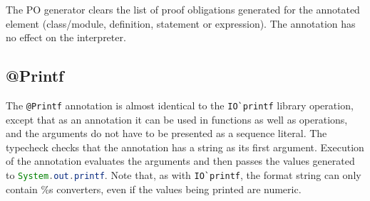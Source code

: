 The PO generator clears the list of proof obligations generated for
the annotated element (class/module, definition, statement or
expression). The annotation has no effect on the interpreter.

\subsection{@Printf}

The \lstinline[language=VDM++]|@Printf| annotation is almost identical
to the \lstinline[language=VDM++]|IO`printf| library operation, except
that as an annotation it can be used in functions as well as
operations, and the arguments do not have to be presented as a
sequence literal. The typecheck checks that the annotation has a
string as its first argument. Execution of the annotation evaluates
the arguments and then passes the values generated to
\lstinline[language=Java]|System.out.printf|. Note that, as with
\lstinline[language=VDM++]|IO`printf|, the format string can only
contain \%s converters, even if the values being printed are numeric.




